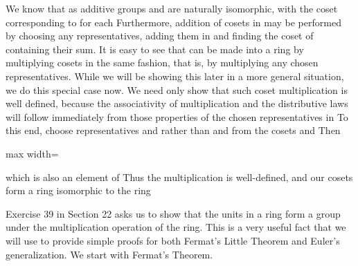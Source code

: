 \documentclass[11pt,oneside]{article}
\begin{document}
\fi
\renewcommand{\BookFooter}{Section 24 Fermat’s and Euler’s Theorems}
\ifdefined\BookMaster\else\setcounter{page}{200}\fi
\BookNarrativetrue

\begin{BookBody}



\noindent We know that as additive groups and  are naturally isomorphic, with the coset  corresponding to  for each  Furthermore, addition of cosets in  may be performed by choosing any representatives, adding them in  and finding the coset of  containing their sum. It is easy to see that  can be made into a ring by multiplying cosets in the same fashion, that is, by multiplying any chosen representatives. While we will be showing this later in a more general situation, we do this special case now. We need only show that such coset multiplication is well defined, because the associativity of multiplication and the distributive laws will follow immediately from those properties of the chosen representatives in  To this end, choose representatives  and  rather than  and  from the cosets  and  Then

\begin{center}\begin{adjustbox}{max width=\linewidth}\end{adjustbox}\end{center}

\noindent which is also an element of  Thus the multiplication is well-defined, and our cosets form a ring isomorphic to the ring 

Exercise 39 in Section 22 asks us to show that the units in a ring form a group under the multiplication operation of the ring. This is a very useful fact that we will use to provide simple proofs for both Fermat’s Little Theorem and Euler’s generalization. We start with Fermat’s Theorem.


\end{BookBody}
\end{document}

